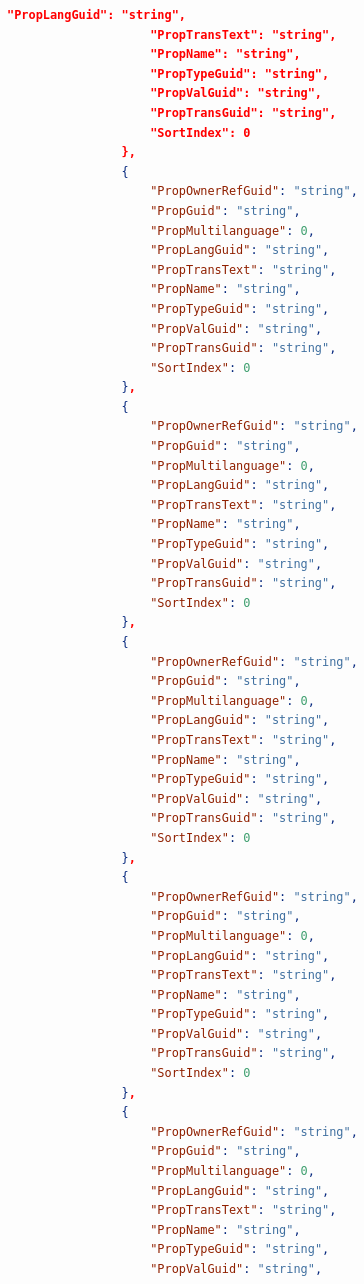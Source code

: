 \begin{lstlisting}[language=json]
                    "PropLangGuid": "string",
                    "PropTransText": "string",
                    "PropName": "string",
                    "PropTypeGuid": "string",
                    "PropValGuid": "string",
                    "PropTransGuid": "string",
                    "SortIndex": 0
                },
                {
                    "PropOwnerRefGuid": "string",
                    "PropGuid": "string",
                    "PropMultilanguage": 0,
                    "PropLangGuid": "string",
                    "PropTransText": "string",
                    "PropName": "string",
                    "PropTypeGuid": "string",
                    "PropValGuid": "string",
                    "PropTransGuid": "string",
                    "SortIndex": 0
                },
                {
                    "PropOwnerRefGuid": "string",
                    "PropGuid": "string",
                    "PropMultilanguage": 0,
                    "PropLangGuid": "string",
                    "PropTransText": "string",
                    "PropName": "string",
                    "PropTypeGuid": "string",
                    "PropValGuid": "string",
                    "PropTransGuid": "string",
                    "SortIndex": 0
                },
                {
                    "PropOwnerRefGuid": "string",
                    "PropGuid": "string",
                    "PropMultilanguage": 0,
                    "PropLangGuid": "string",
                    "PropTransText": "string",
                    "PropName": "string",
                    "PropTypeGuid": "string",
                    "PropValGuid": "string",
                    "PropTransGuid": "string",
                    "SortIndex": 0
                },
                {
                    "PropOwnerRefGuid": "string",
                    "PropGuid": "string",
                    "PropMultilanguage": 0,
                    "PropLangGuid": "string",
                    "PropTransText": "string",
                    "PropName": "string",
                    "PropTypeGuid": "string",
                    "PropValGuid": "string",
                    "PropTransGuid": "string",
                    "SortIndex": 0
                },
                {
                    "PropOwnerRefGuid": "string",
                    "PropGuid": "string",
                    "PropMultilanguage": 0,
                    "PropLangGuid": "string",
                    "PropTransText": "string",
                    "PropName": "string",
                    "PropTypeGuid": "string",
                    "PropValGuid": "string",

\end{lstlisting}
